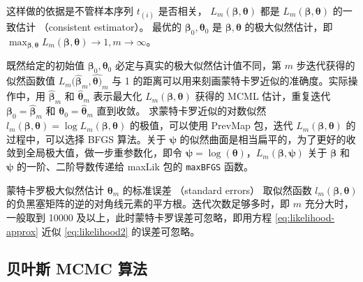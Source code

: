 \documentclass[12pt,a4paper,UTF8,twoside]{book}
\theoremstyle{definition}
\theoremstyle{definition}
\theoremstyle{definition}
\theoremstyle{remark}
\begin{document}
\noindent 这样做的依据是不管样本序列 \(t_{(i)}\) 是否相关，
\(L_{m}(\boldsymbol{\beta},\boldsymbol{\theta})\) 都是
\(L_{m}(\boldsymbol{\beta},\boldsymbol{\theta})\) 的一致估计
（consistent estimator）\citep{PrevMap2017JSS}。 最优的
\(\boldsymbol{\beta}_0,\boldsymbol{\theta}_0\) 是
\(\boldsymbol{\beta},\boldsymbol{\theta}\)
的极大似然估计，即\(\max_{\boldsymbol{\beta},\boldsymbol{\theta}}L_{m}(\boldsymbol{\beta},\boldsymbol{\theta}) \rightarrow 1, m \rightarrow\infty\)。

既然给定的初始值 \(\boldsymbol{\beta}_{0},\boldsymbol{\theta}_{0}\)
必定与真实的极大似然估计值不同，第 \(m\) 步迭代获得的似然函数值
\(L_{m}(\hat{\boldsymbol{\beta}}_{m}, \hat{\boldsymbol{\theta})}_{m}\)
与 1 的距离可以用来刻画蒙特卡罗近似的准确度。实际操作中，用
\(\hat{\boldsymbol{\beta}}_{m}\) 和 \(\hat{\boldsymbol{\theta}}_{m}\)
表示最大化 \(L_{m}(\boldsymbol{\beta}, \boldsymbol{\theta})\) 获得的
MCML 估计，重复迭代
\(\boldsymbol{\beta}_{0} = \hat{\boldsymbol{\beta}}_{m}\) 和
\(\boldsymbol{\theta}_{0} = \hat{\boldsymbol{\theta}}_{m}\) 直到收敛。
求蒙特卡罗近似的对数似然
\(l_{m}(\boldsymbol{\beta}, \boldsymbol{\theta}) = \log L_{m}(\boldsymbol{\beta}, \boldsymbol{\theta})\)
的极值，可以使用 PrevMap 包，迭代
\(L_{m}(\boldsymbol{\beta}, \boldsymbol{\theta})\) 的过程中，可以选择
BFGS 算法。关于 \(\boldsymbol{\psi}\)
的似然曲面是相当扁平的，为了更好的收敛到全局极大值，做一步重参数化，即令
\(\boldsymbol{\psi} = \log(\boldsymbol{\theta})\)，\(L_{m}(\boldsymbol{\beta}, \boldsymbol{\psi})\)
关于 \(\boldsymbol{\beta}\) 和 \(\boldsymbol{\psi}\)
的一阶、二阶导数传递给 maxLik 包的 \texttt{maxBFGS} 函数。

蒙特卡罗极大似然估计 \(\boldsymbol{\theta}_{m}\) 的标准误差 （standard
errors） 取似然函数 \(l_{m}(\boldsymbol{\beta},\boldsymbol{\theta})\)
的负黑塞矩阵的逆的对角线元素的平方根。迭代次数足够多时，即 \(m\)
充分大时，一般取到 10000 及以上，此时蒙特卡罗误差可忽略，即用方程
\eqref{eq:likelihood-approx} 近似 \eqref{eq:likelihood2} 的误差可忽略。

\hypertarget{sec:MCMC}{%
\subsection{贝叶斯 MCMC 算法}\label{sec:MCMC}}
\end{document}
